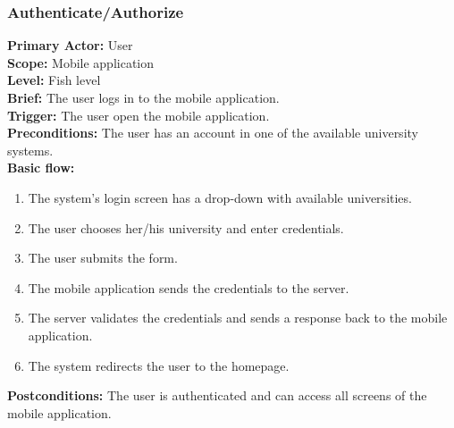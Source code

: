 
\subsubsection{\large{Authenticate/Authorize}}
\textbf{Primary Actor:} User\\
\textbf{Scope:} Mobile application\\
\textbf{Level:} Fish level\\
\textbf{Brief:} The user logs in to the mobile application.\\
\textbf{Trigger:} The user open the mobile application.\\
\textbf{Preconditions:}
The user has an account in one of the available university systems.\\
\textbf{Basic flow:}
\begin{enumerate}
    \item The system's login screen has a drop-down with available universities.
    \item The user chooses her/his university and enter credentials.
    \item The user submits the form.
    \item The mobile application sends the credentials to the server.
    \item The server validates the credentials and sends a response back to the mobile application.
    \item The system redirects the user to the homepage.
\end{enumerate}
\textbf{Postconditions:}
The user is authenticated and can access all screens of the mobile application.


